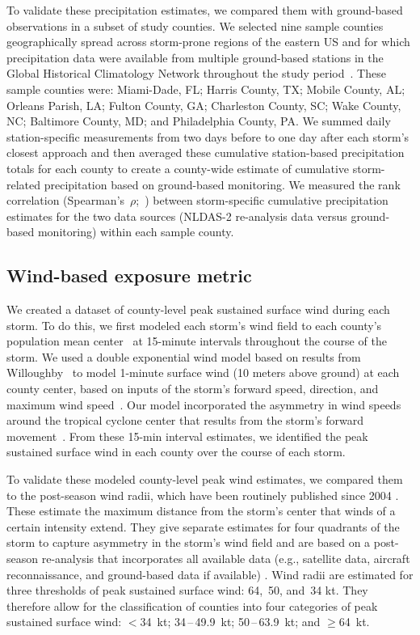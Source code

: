 To validate these precipitation estimates, we compared them with ground-based
observations in a subset of study counties. We selected nine sample counties
geographically spread across storm-prone regions of the eastern \ac{US} and for
which precipitation data were available from multiple ground-based stations
in the Global Historical Climatology Network throughout the study
period~\parencite{menne2012overview, rnoaa, countyweather}. These sample
counties were: Miami-Dade, FL; Harris County, TX; Mobile County, AL; Orleans
Parish, LA; Fulton County, GA; Charleston County, SC; Wake County, NC;
Baltimore County, MD; and Philadelphia County, PA. We summed daily
station-specific measurements from two days before to one day after each
storm's closest approach and then averaged these cumulative station-based
precipitation totals for each county to create a county-wide estimate of
cumulative storm-related precipitation based on ground-based monitoring. We
measured the rank correlation (Spearman's~$\rho$;~\textcite{spearman1904proof})
between storm-specific cumulative precipitation estimates for the two data
sources (\ac{NLDAS-2} re-analysis data versus ground-based monitoring) within
each sample county.

\subsection*{Wind-based exposure metric}

We created a dataset of county-level peak sustained surface wind during each
storm. To do this, we first modeled each storm's wind field to each county's
population mean center~\parencite{countycenters} at 15-minute intervals
throughout the course of the storm. We used a double exponential wind model
based on results from Willoughby~\parencite{willoughby2006parametric} to model
1-minute surface wind (10 meters above ground) at each county center, based on
inputs of the storm's forward speed, direction, and maximum wind
speed~\parencite{stormwindmodel}. Our model incorporated the asymmetry in wind
speeds around the tropical cyclone center that results from the storm's forward
movement~\parencite{phadke2003modeling}.  From these 15-\si{\minute} interval
estimates, we identified the peak sustained surface wind in each county over
the course of each storm.

To validate these modeled county-level peak wind estimates, we compared them
to the  post-season wind radii, which have been routinely published
since 2004 \parencite{knaff2016using}. These estimate the maximum
distance from the storm's center that winds of a certain intensity extend. They
give separate estimates for four quadrants of the storm to capture asymmetry in
the storm's wind field and are based on a post-season re-analysis that
incorporates all available data (e.g., satellite data, aircraft reconnaissance, and
ground-based data if available) \parencite{knaff2016using}. Wind radii are
estimated for three thresholds of peak sustained surface wind: 64,~50, and~34
kt.  They therefore allow for the classification of counties into four
categories of peak sustained surface wind: $<$34~kt; 34\,--\,49.9~kt;
50\,--\,63.9~kt; and $\ge$64~kt. 


